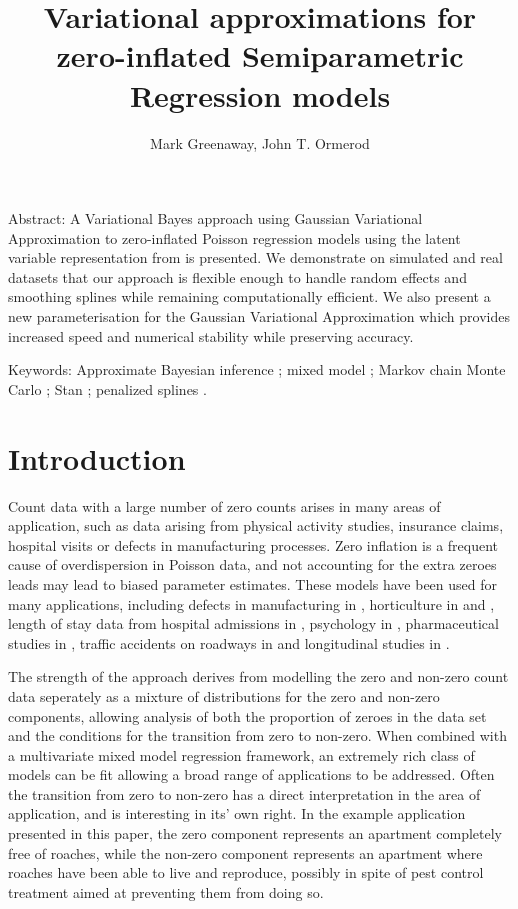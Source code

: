 \documentclass{article}[12pt]
\title{Variational approximations for zero-inflated Semiparametric Regression models}
\author{Mark Greenaway, John T. Ormerod}
\begin{document}
\maketitle

Abstract: A Variational Bayes approach using Gaussian Variational Approximation to zero-inflated Poisson
regression models using the latent variable representation from \cite{Ghosh20061360} is presented. We
demonstrate on simulated and real datasets that our approach is flexible enough to handle random effects and
smoothing splines while remaining computationally efficient. We also present a new parameterisation for
the Gaussian Variational Approximation which provides increased speed and numerical stability while preserving
accuracy.

Keywords: Approximate Bayesian inference ; mixed model ; Markov chain Monte Carlo ; Stan ; 
					penalized splines .

\section{Introduction}
\label{sec:introduction}

Count data with a large number of zero counts arises in many areas of application, such as data arising from
physical activity studies, insurance claims, hospital visits or defects in manufacturing processes. Zero
inflation is a frequent cause of overdispersion in Poisson data, and not accounting for the extra zeroes leads
may lead to biased parameter estimates. These models have been used for many applications, including defects
in manufacturing in \cite{lambert1992}, horticulture in \cite{BIOM:BIOM1030} and \cite{Hall2000}, length of
stay data from hospital admissions in \cite{BIMJ:BIMJ200390024}, psychology in \cite{JOFP:rethink},
pharmaceutical studies in \cite{Min01042005}, traffic accidents on roadways in \cite{Shankar1997829} and
longitudinal studies in \cite{LeeWangScottYauMcLachlan2006}.

The strength of the approach derives from modelling the zero and non-zero count data seperately as a mixture
of distributions for the zero and non-zero components, allowing analysis of both the proportion of zeroes in
the data set and the conditions for the transition from zero to non-zero. When combined with a multivariate
mixed model regression framework, an extremely rich class of models can be fit allowing a broad range of
applications to be addressed. Often the transition from zero to non-zero has a direct interpretation in the
area of application, and is interesting in its' own right. In the example application presented in this paper,
the zero component represents an apartment completely free of roaches, while the non-zero component represents
an apartment where roaches have been able to live and reproduce, possibly in spite of pest control treatment
aimed at preventing them from doing so.
\end{document}
